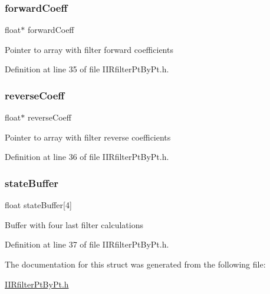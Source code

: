 \subsubsection{\texorpdfstring{forwardCoeff}{forwardCoeff}}
{\footnotesize\ttfamily float$\ast$ forward\+Coeff}

Pointer to array with filter forward coefficients 

Definition at line 35 of file I\+I\+Rfilter\+Pt\+By\+Pt.\+h.

\mbox{\label{struct_i_i_r3rd_order_filter_obj_a71cf702e70d0407aedf468a1d5f09242_a71cf702e70d0407aedf468a1d5f09242}} 
\subsubsection{\texorpdfstring{reverseCoeff}{reverseCoeff}}
{\footnotesize\ttfamily float$\ast$ reverse\+Coeff}

Pointer to array with filter reverse coefficients 

Definition at line 36 of file I\+I\+Rfilter\+Pt\+By\+Pt.\+h.

\mbox{\label{struct_i_i_r3rd_order_filter_obj_ae9f84817b632b6a5201aef11129e44a4_ae9f84817b632b6a5201aef11129e44a4}} 
\subsubsection{\texorpdfstring{stateBuffer}{stateBuffer}}
{\footnotesize\ttfamily float state\+Buffer\mbox{[}4\mbox{]}}

Buffer with four last filter calculations 

Definition at line 37 of file I\+I\+Rfilter\+Pt\+By\+Pt.\+h.



The documentation for this struct was generated from the following file\+:\begin{DoxyCompactItemize}
\item 
\mbox{\hyperlink{_i_i_rfilter_pt_by_pt_8h}{I\+I\+Rfilter\+Pt\+By\+Pt.\+h}}\end{DoxyCompactItemize}
